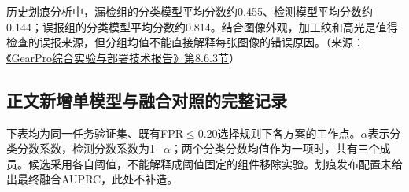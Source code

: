 历史划痕分析中，漏检组的分类模型平均分数约0.455、检测模型平均分数约0.144；误报组的分类模型平均分数约0.814。结合图像外观，加工纹和高光是值得检查的误报来源，但分组均值不能直接解释每张图像的错误原因。（来源：\protect\href{run:../GearPro_综合技术报告_Markdown含配图/GearPro_综合实验与部署技术报告.md}{《GearPro综合实验与部署技术报告》第8.6.3节}）

\FloatBarrier{}\subsection{正文新增单模型与融合对照的完整记录}
下表均为同一任务验证集、既有FPR\ensuremath{\leq}0.20选择规则下各方案的工作点。\ensuremath{\alpha}表示分类分数系数，检测分数系数为1\ensuremath{-}\ensuremath{\alpha}；两个分类分数均值作为一项时，共有三个成员。候选采用各自阈值，不能解释成阈值固定的组件移除实验。划痕发布配置未给出最终融合AUPRC，此处不补造。


